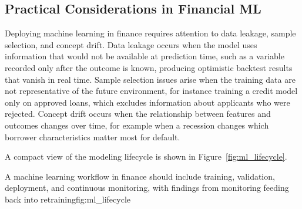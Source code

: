 \documentclass[../ai_in_finance]{subfiles}
\begin{document}
\subsection{Practical Considerations in Financial ML}

Deploying machine learning in finance requires attention to data leakage, sample selection, and concept drift. Data leakage occurs when the model uses information that would not be available at prediction time, such as a variable recorded only after the outcome is known, producing optimistic backtest results that vanish in real time. Sample selection issues arise when the training data are not representative of the future environment, for instance training a credit model only on approved loans, which excludes information about applicants who were rejected. Concept drift occurs when the relationship between features and outcomes changes over time, for example when a recession changes which borrower characteristics matter most for default.

A compact view of the modeling lifecycle is shown in Figure~\ref{fig:ml_lifecycle}.

\begin{bookfigure}{A machine learning workflow in finance should include training, validation, deployment, and continuous monitoring, with findings from monitoring feeding back into retraining}{fig:ml_lifecycle}
\end{bookfigure}
\end{document}
